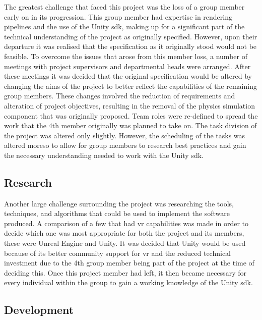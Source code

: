         The greatest challenge that faced this project was the loss of a group member early on in its progression. This group member had expertise in rendering pipelines and the use of the Unity \acrshort{sdk}, making up for a significant part of the technical understanding of the project as originally specified. However, upon their departure it was realised that the specification as it originally stood would not be feasible. To overcome the issues that arose from this member loss, a number of meetings with project supervisors and departmental heads were arranged. After these meetings it was decided that the original specification would be altered by changing the aims of the project to better reflect the capabilities of the remaining group members. These changes involved the reduction of requirements and alteration of project objectives, resulting in the removal of the physics simulation component that was originally proposed. Team roles were re-defined to spread the work that the 4th member originally was planned to take on. The task division of the project was altered only slightly. However, the scheduling of the tasks was altered moreso to allow for group members to research best practices and gain the necessary understanding needed to work with the Unity \acrshort{sdk}.
    
    \subsection{Research}
    
        Another large challenge surrounding the project was researching the tools, techniques, and algorithms that could be used to implement the software produced. A comparison of a few  that had \acrshort{vr} capabilities was made in order to decide which one was most appropriate for both the project and its members, these  were Unreal Engine and Unity. It was decided that Unity would be used because of its better community support for \acrshort{vr} and the reduced technical investment due to the 4th group member being part of the project at the time of deciding this. Once this project member had left, it then became necessary for every individual within the group to gain a working knowledge of the Unity \acrshort{sdk}.
    
    \subsection{Development}
    
